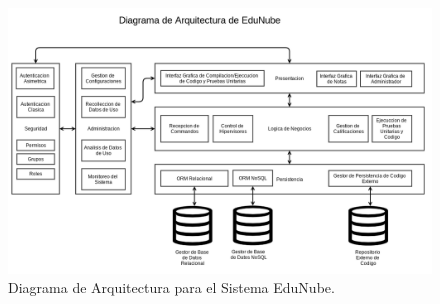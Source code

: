 \begin{landscape}

	\begin{figure}
	  \begin{center}
	    \includegraphics[width=1.0\textwidth]{Figures/arq_en.png}
	  \end{center}
	  \caption{Diagrama de Arquitectura para el Sistema EduNube.}
	  \label{arq_en}
	\end{figure}

\end{landscape}

